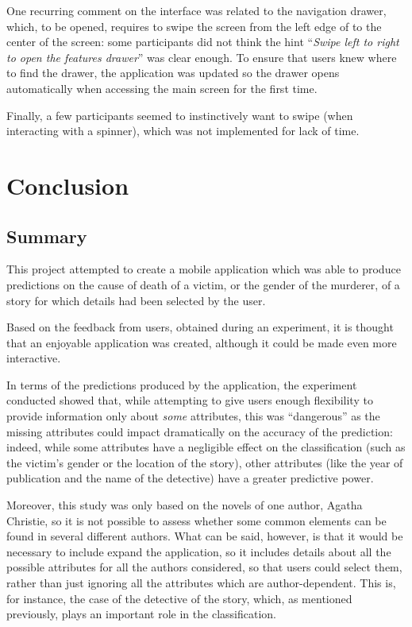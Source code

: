 \documentclass{mproj}
\begin{document}
One recurring comment on the interface was related to the navigation drawer, which, to be opened, requires to swipe the screen from the left edge of to the center of the screen: some participants did not think the hint ``\textit{Swipe left to right to open the features drawer}'' was clear enough. To ensure that users knew where to find the drawer, the application was updated so the drawer opens automatically when accessing the main screen for the first time.

Finally, a few participants seemed to instinctively want to swipe (when interacting with a spinner), which was not implemented for lack of time.

\chapter{Conclusion}\label{conclusion}

\section{Summary}

This project attempted to create a mobile application which was able to produce predictions on the cause of death of a victim, or the gender of the murderer, of a story for which details had been selected by the user.

Based on the feedback from users, obtained during an experiment, it is thought that an enjoyable application was created, although it could be made even more interactive.

In terms of the predictions produced by the application, the experiment conducted showed that, while attempting to give users enough flexibility to provide information only about \textit{some} attributes, this was ``dangerous'' as the missing attributes could impact dramatically on the accuracy of the prediction: indeed, while some attributes have a negligible effect on the classification (such as the victim's gender or the location of the story), other attributes (like the year of publication and the name of the detective) have a greater predictive power.

Moreover, this study was only based on the novels of one author, Agatha Christie, so it is not possible to assess whether some common elements can be found in several different authors. What can be said, however, is that it would be necessary to include expand the application, so it includes details about all the possible attributes for all the authors considered, so that users could select them, rather than just ignoring all the attributes which are author-dependent. This is, for instance, the case of the detective of the story, which, as mentioned previously, plays an important role in the classification.
\end{document}
